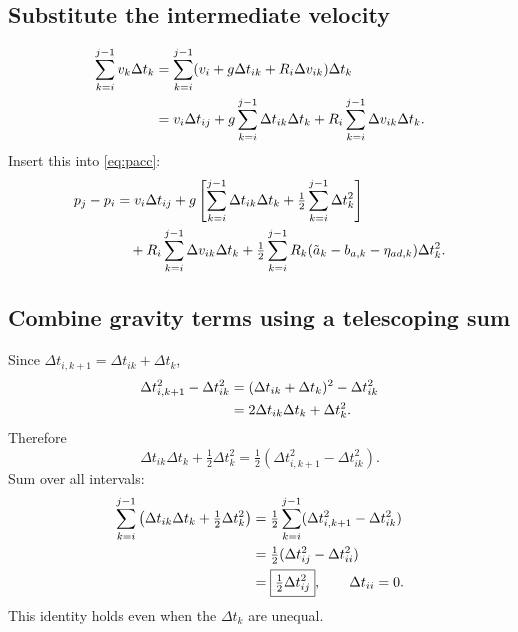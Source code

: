 \documentclass[11pt,a4paper]{article}
\begin{document}
\subsection{Substitute the intermediate velocity}
\begin{align}
\sum_{k=i}^{j-1}v_k\Delta t_k
&=\sum_{k=i}^{j-1}(v_i+g\Delta t_{ik}+R_i\Delta v_{ik})\Delta t_k\notag\\
&=v_i\Delta t_{ij}+g\sum_{k=i}^{j-1}\Delta t_{ik}\Delta t_k
+R_i\sum_{k=i}^{j-1}\Delta v_{ik}\Delta t_k.
\end{align}
Insert this into \eqref{eq:pacc}:
\begin{align}
p_j-p_i
&=v_i\Delta t_{ij}
+g\left[\sum_{k=i}^{j-1}\Delta t_{ik}\Delta t_k+\tfrac12\sum_{k=i}^{j-1}\Delta t_k^2\right]\notag\\
&\quad+R_i\sum_{k=i}^{j-1}\Delta v_{ik}\Delta t_k
+\tfrac12\sum_{k=i}^{j-1}R_k(\tilde a_k-b_{a,k}-\eta_{ad,k})\Delta t_k^2.
\label{eq:pintermediate}
\end{align}

\subsection{Combine gravity terms using a telescoping sum}
Since $\Delta t_{i,k+1}=\Delta t_{ik}+\Delta t_k$,
\begin{align}
\Delta t_{i,k+1}^2-\Delta t_{ik}^2
&=(\Delta t_{ik}+\Delta t_k)^2-\Delta t_{ik}^2\notag\\
&=2\Delta t_{ik}\Delta t_k+\Delta t_k^2.
\end{align}
Therefore
\begin{equation}
\Delta t_{ik}\Delta t_k+\tfrac12\Delta t_k^2
=\tfrac12(\Delta t_{i,k+1}^2-\Delta t_{ik}^2).
\end{equation}
Sum over all intervals:
\begin{align}
\sum_{k=i}^{j-1}\left(\Delta t_{ik}\Delta t_k+\tfrac12\Delta t_k^2\right)
&=\tfrac12\sum_{k=i}^{j-1}(\Delta t_{i,k+1}^2-\Delta t_{ik}^2)\notag\\
&=\tfrac12(\Delta t_{ij}^2-\Delta t_{ii}^2)\notag\\
&=\boxed{\tfrac12\Delta t_{ij}^2},\qquad \Delta t_{ii}=0.
\end{align}
This identity holds even when the $\Delta t_k$ are unequal.
\end{document}
